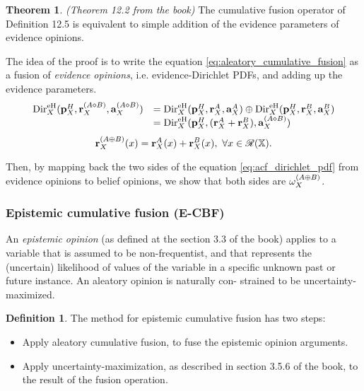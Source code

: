 \documentclass[a4paper,12pt]{article}
\theoremstyle{definition}
\newtheorem{definition}{Definition}[section]
\theoremstyle{theorem}
\newtheorem{theorem}{Theorem}[section]
\numberwithin{equation}{section}
\begin{document}
\begin{theorem}
\emph{(Theorem 12.2 from the book)} The cumulative fusion operator of Definition 12.5 is equivalent to
simple addition of the evidence parameters of evidence opinions.
\end{theorem}

The idea of the proof is to write the equation \ref{eq:aleatory_cumulative_fusion} as a fusion of \emph{evidence opinions}, i.e. evidence-Dirichlet PDFs, and adding up the evidence parameters.
\begin{equation}\label{eq:acf_dirichlet_pdf}
\begin{array}{rl}
\mathrm{Dir}^{\mathrm{eH}}_X(\mathbf{p}^H_X, \mathbf{r}^{(A \diamond B)}_X, \mathbf{a}^{(A \diamond B)}_X) &  = \mathrm{Dir}^{\mathrm{eH}}_X(\mathbf{p}^H_X, \mathbf{r}^{A}_X, \mathbf{a}^A_X) \oplus \mathrm{Dir}^{\mathrm{eH}}_X(\mathbf{p}^H_X, \mathbf{r}^{B}_X, \mathbf{a}^B_X) \\
& = \mathrm{Dir}^{\mathrm{eH}}_X(\mathbf{p}^H_X, (\mathbf{r}^{A}_X + \mathbf{r}^{B}_X), \mathbf{a}^{(A \diamond B)}_X)
\end{array}
\end{equation}
\begin{equation}
\mathbf{r}^{(A \oplus B)}_X(x) = \mathbf{r}^A_X(x) + \mathbf{r}^B_X(x),\ \forall x \in \mathcal{R}(\mathbb{X})\text{.}
\end{equation}

Then, by mapping back the two sides of the equation \ref{eq:acf_dirichlet_pdf} from evidence opinions to belief opinions, we show that both sides are $\omega^{(A \oplus B)}_{X}$.


\subsubsection{Epistemic cumulative fusion (E-CBF)}

An \emph{epistemic opinion} (as defined at the section 3.3 of the book) applies to a variable that is assumed to be non-frequentist, and that represents the (uncertain) likelihood of values of the variable in a specific unknown past or future instance. An aleatory opinion is naturally con-
strained to be uncertainty-maximized.

\begin{definition}
The method for epistemic cumulative fusion has two steps:
\begin{itemize}
\item[1.] Apply aleatory cumulative fusion, to fuse the epistemic opinion arguments.
\item[2.] Apply uncertainty-maximization, as described in section 3.5.6 of the book, to the result of the fusion operation.
\end{itemize}
\end{definition}
\end{document}
